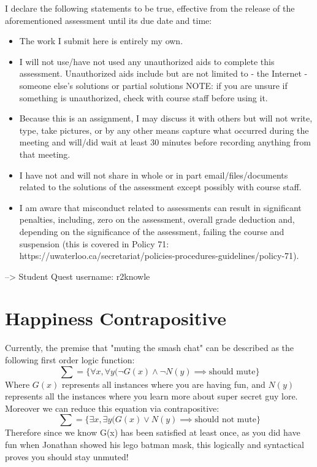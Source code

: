 \documentclass[12pt]{article}
\begin{document}
I declare the following statements to be true, effective from the release of 
the aforementioned assessment until its due date and time: 
\begin{itemize}
\item The work I submit here is entirely my own. 
\item I will not use/have not used any unauthorized aids to complete this assessment. 
Unauthorized aids include but are not limited to
     - the Internet
     - someone else's solutions or partial solutions
NOTE:  if you are unsure if something is unauthorized, check with course staff 
before using it. 
\item Because this is an assignment, I may discuss it with others but will not write, 
type, take pictures, or by any other means capture what occurred during the meeting 
and will/did wait at least 30 minutes before recording anything from that meeting. 
\item I have not and will not share in whole or in part email/files/documents related 
to the solutions of the assessment except possibly with course staff. 
\item I am aware that misconduct related to assessments can result in significant 
penalties, including, zero on the assessment, overall grade deduction and, depending 
on the significance of the assessment, failing the course and suspension (this is 
covered in Policy 71: 
https://uwaterloo.ca/secretariat/policies-procedures-guidelines/policy-71). 

\end{itemize}
--> Student Quest username: r2knowle


\section{Happiness Contrapositive}
\label{sec:assignment-guidelines}

Currently, the premise that "muting the smash chat" can be described as the following first order logic function:
\[ \sum = \{\forall{x},\forall{y}(\neg G(x) \land \neg N(y) \implies \text{should mute} \} \]
Where $G(x)$ represents all instances where you are having fun, and $N(y)$ represents all the instances where you learn more about super secret guy lore. Moreover we can reduce this equation via contrapositive:
\[ \sum = \{\exists{x},\exists{y}(G(x) \lor N(y) \implies \text{should not mute} \} \]
Therefore since we know G(x) has been satisfied at least once, as you did have fun when Jonathan showed his lego batman mask, this logically and syntactical proves you should stay unmuted!
\end{document}
